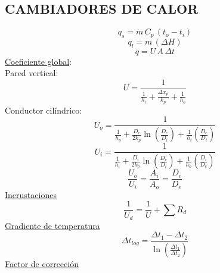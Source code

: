 \documentclass[letter,oneside,10pt]{article}
\begin{document}
\begin{multicols}{3}
\section*{CAMBIADORES DE CALOR}
\vspace{-0.3cm}
\begin{equation*}
    q_s = \dot{m}\,C_p\,(t_o - t_i)
\end{equation*}
\vspace{-0.2cm}
\begin{equation*}
    q_l = \dot{m}\,(\Delta H)
\end{equation*}
\vspace{-0.2cm}
\begin{equation*}
    q = U\,A\,\Delta t
\end{equation*}
\underline{Coeficiente global}:\\
Pared vertical:
\vspace{-0.3cm}
\begin{equation*}
    U = \dfrac{1}{\frac{1}{h_i} + \frac{\Delta x_p}{k_p} + \frac{1}{h_o}}
\end{equation*}
Conductor cilíndrico:
\vspace{-0.3cm}
\begin{equation*}
    U_o = \dfrac{1}{\frac{1}{h_o} + \frac{D_e}{2k_p}\ln\left(\frac{D_e}{D_i}\right) + \frac{1}{h_i}\left(\frac{D_e}{D_i}\right)}
\end{equation*}
\vspace{-0.3cm}
\begin{equation*}
    U_i = \dfrac{1}{\frac{1}{h_i} + \frac{D_i}{2k_p}\ln\left(\frac{D_e}{D_i}\right) + \frac{1}{h_o}\left(\frac{D_i}{D_e}\right)}
\end{equation*}
\vspace{-0.3cm}
\begin{equation*}
    \frac{U_o}{U_i} = \frac{A_i}{A_o} = \frac{D_i}{D_e}
\end{equation*}
\underline{Incrustaciones}
\vspace{-0.3cm}
\begin{equation*}
    \frac{1}{U_{d}} = \frac{1}{U} + \sum R_d
\end{equation*}
\underline{Gradiente de temperatura}
\vspace{-0.3cm}
\begin{equation*}
    \Delta t_{log} = \frac{\Delta t_1 - \Delta t_2}{\ln\left(\frac{\Delta t_1}{\Delta t_2}\right)}
\end{equation*}
\underline{Factor de corrección}
\vspace{-0.3cm}

\end{multicols}
\end{document}
